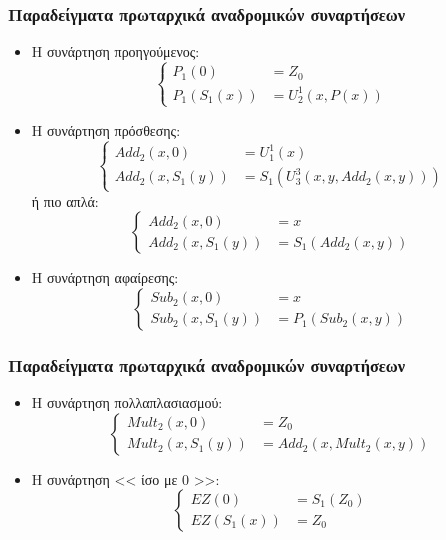 \documentclass{beamer}
\begin{document}
\begin{frame}
  \frametitle{Παραδείγματα πρωταρχικά αναδρομικών συναρτήσεων}
  \begin{itemize}
  \item Η συνάρτηση προηγούμενος:
    $$
    \left\{
    \begin{array}{ll}
      P_1(0)      &= Z_0\\
      P_1(S_1(x)) &= U^1_2(x,P(x))
    \end{array}
    \right.
    $$
    \pause
  \item Η συνάρτηση πρόσθεσης:
    $$
    \left\{
    \begin{array}{ll}
      Add_2(x, 0)      &= U^1_1(x)\\
      Add_2(x, S_1(y)) &= S_1(U^3_3(x, y , Add_2(x, y)))
    \end{array}
    \right.
    $$
    ή πιο απλά:
    $$
    \left\{
    \begin{array}{ll}
      Add_2(x, 0)      &= x\\
      Add_2(x, S_1(y)) &= S_1(Add_2(x, y))
    \end{array}
    \right.
    $$
    \pause
  \item Η συνάρτηση αφαίρεσης:
    $$
    \left\{
    \begin{array}{ll}
      Sub_2(x, 0)      &= x\\
      Sub_2(x, S_1(y)) &= P_1(Sub_2(x, y))
    \end{array}
    \right.
    $$
  \end{itemize}
\end{frame}

\begin{frame}
  \frametitle{Παραδείγματα πρωταρχικά αναδρομικών συναρτήσεων}
  \begin{itemize}
  \item Η συνάρτηση πολλαπλασιασμού:
    $$
    \left\{
    \begin{array}{ll}
      Mult_2(x, 0)      &= Z_0\\
      Mult_2(x, S_1(y)) &= Add_2(x, Mult_2(x, y))
    \end{array}
    \right.
    $$
    \pause
  \item Η συνάρτηση << ίσο με 0 >>:
    $$
    \left\{
    \begin{array}{ll}
      EZ(0)      &= S_1(Z_0)\\
      EZ(S_1(x)) &= Z_0
    \end{array}
    \right.
    $$
  \end{itemize}
\end{frame}
\end{document}
